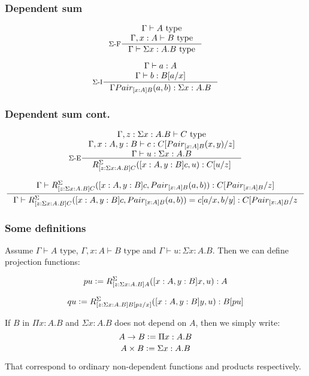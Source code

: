 \documentclass{beamer}
\begin{document}
\begin{frame}
  \frametitle{Dependent sum}

  \[
    \inference[$\Sigma$-F]{\Gamma \vdash A \text{ type}\\ \Gamma, x:A \vdash B \text{ type}}{\Gamma \vdash \Sigma x : A. B \text{ type}}
  \]

  \[
    \inference[$\Sigma$-I]{\Gamma \vdash a : A\\ \Gamma\vdash b: B[a / x]}{\Gamma Pair_{[x:A]B} (a,b) : \Sigma x : A. B}
  \]

\end{frame}

\begin{frame}

  \frametitle{Dependent sum cont.}

  \[
    \inference[$\Sigma$-E]{\Gamma, z : \Sigma x: A. B \vdash C \text{ type}\\ \Gamma, x: A, y: B \vdash c : C[Pair_{[x:A]B}(x, y)/z]\\ \Gamma \vdash u : \Sigma x: A. B}
      {R^\Sigma_{[z : \Sigma x: A. B]C}([x : A, y: B]c, u): C[u/z]}
  \]

  \[
    \inference{\Gamma\vdash R^\Sigma_{[z : \Sigma x: A. B]C}([x : A, y: B]c, Pair_{[x:A]B}(a,b)): C[Pair_{[x:A]B}/z]}
      {\Gamma\vdash R^\Sigma_{[z : \Sigma x: A. B]C}([x : A, y: B]c, Pair_{[x:A]B}(a,b)) = c[a/x,b/y] : C [Pair_{[x:A]B}/z}
  \]

\end{frame}

\begin{frame}

  \frametitle{Some definitions}

  Assume $\Gamma \vdash A \text{ type}$, $\Gamma, x : A \vdash B \text{ type}$
  and $\Gamma \vdash u : \Sigma x:A. B$. Then we can define projection
  functions:

  \begin{equation*}
    pu \vcentcolon= R^\Sigma_{[z : \Sigma x: A. B]A}([x : A, y: B]x, u) : A
  \end{equation*}

  \begin{equation*}
    qu \vcentcolon= R^\Sigma_{[z : \Sigma x: A. B]B[pz/x]}([x : A, y: B]y, u) : B[pu]
  \end{equation*}

  If $B$ in $\Pi x: A. B$ and $\Sigma x: A. B$ does not depend on $A$, then we
  simply write:
  \begin{equation*}
    A \to B \vcentcolon= \Pi x: A. B
  \end{equation*}
  \begin{equation*}
    A \times B \vcentcolon= \Sigma x: A. B
  \end{equation*}

  That correspond to ordinary non-dependent functions and products respectively.

\end{frame}
\end{document}
